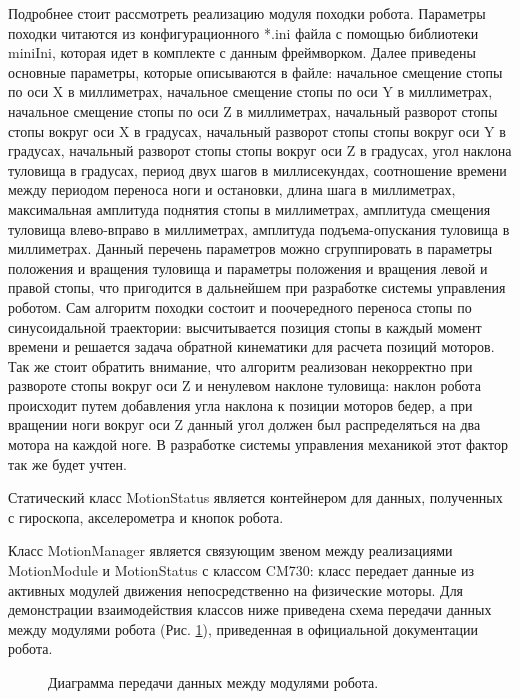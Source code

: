 Подробнее стоит рассмотреть реализацию модуля походки робота. Параметры походки читаются из конфигурационного *.ini файла с помощью библиотеки miniIni, которая идет в комплекте с данным фреймворком. Далее приведены основные параметры, которые описываются в файле: начальное смещение стопы по оси X в миллиметрах, начальное смещение стопы по оси Y в миллиметрах, начальное смещение стопы по оси Z в миллиметрах, начальный разворот стопы стопы вокруг оси X в градусах, начальный разворот стопы стопы вокруг оси Y в градусах, начальный разворот стопы стопы вокруг оси Z в градусах, угол наклона туловища в градусах, период двух шагов в миллисекундах, соотношение времени между периодом переноса ноги и остановки, длина шага в миллиметрах, максимальная амплитуда поднятия стопы в миллиметрах, амплитуда смещения туловища влево-вправо в миллиметрах, амплитуда подъема-опускания туловища в миллиметрах. Данный перечень параметров можно сгруппировать в параметры положения и вращения туловища и параметры положения и вращения левой и правой стопы, что пригодится в дальнейшем при разработке системы управления роботом. Сам алгоритм походки состоит и поочередного переноса стопы по синусоидальной траектории: высчитывается позиция стопы в каждый момент времени и решается задача обратной кинематики для расчета позиций моторов. Так же стоит обратить внимание, что алгоритм реализован некорректно при развороте стопы вокруг оси Z и ненулевом наклоне туловища: наклон робота происходит путем добавления угла наклона к позиции моторов бедер, а при вращении ноги вокруг оси Z данный угол должен был распределяться на два мотора на каждой ноге. В разработке системы управления механикой этот фактор так же будет учтен.

Статический класс MotionStatus является контейнером для данных, полученных с гироскопа, акселерометра и кнопок робота.

Класс MotionManager является связующим звеном между реализациями MotionModule и MotionStatus с классом CM730: класс передает данные из активных модулей движения непосредственно на физические моторы.
Для демонстрации взаимодействия классов ниже приведена схема передачи данных между модулями робота (Рис. \ref{im:1_framework_pipeline}), приведенная в официальной документации робота.

\begin{figure}[h]
\caption{Диаграмма передачи данных между модулями робота.}
\label{im:1_framework_pipeline}
\end{figure}

